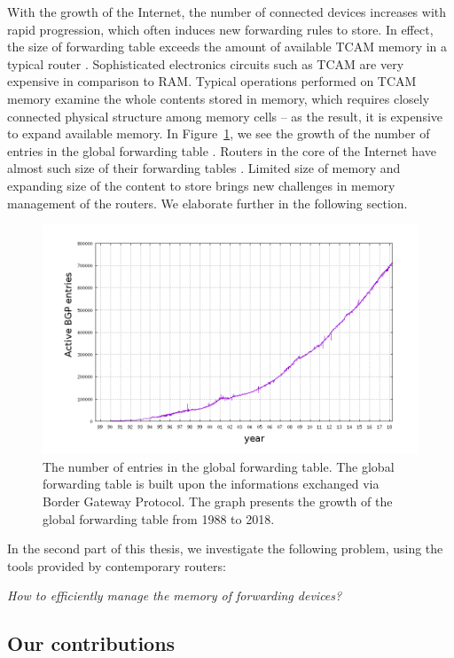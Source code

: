 With the growth of the Internet, the number of connected devices increases with rapid progression, which often induces new forwarding rules to store.
In effect, the size of forwarding table exceeds the amount of available TCAM memory in a typical router .
Sophisticated electronics circuits such as TCAM are very expensive in comparison to RAM.
Typical operations performed on TCAM memory examine the whole contents stored in memory, which requires closely connected physical structure among memory cells -- as the result, it is expensive to expand available memory.
In Figure~\ref{fig:bgp-entries}, we see the growth of the number of entries in the global forwarding table \cite{url-bgp-entries}.
Routers in the core of the Internet have almost such size of their forwarding tables .
Limited size of memory and expanding size of the content to store brings new challenges in memory management of the routers.
We elaborate further in the following section.

\begin{figure}[h]
\centering
\includegraphics[width=0.59\columnwidth]{figs/bgp-entries.png}
\caption{The number of entries in the global forwarding table. The global forwarding table is built upon the informations exchanged via Border Gateway Protocol. The graph presents the growth of the global forwarding table from 1988 to 2018.}\label{fig:bgp-entries}
\vspace{-1em}
\end{figure}



In the second part of this thesis, we investigate the following problem, using the tools provided by contemporary routers:
\begin{center}
  \emph{How to efficiently manage the memory of forwarding devices?}
\end{center}


\subsection{Our contributions}


